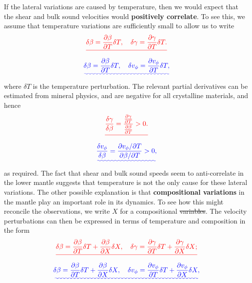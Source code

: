 \documentclass[a4paper,12pt]{paper}
\providecommand{\DIFadd}[1]{{\protect\color{blue}\uwave{#1}}} %
\providecommand{\DIFdel}[1]{{\protect\color{red}\sout{#1}}}                      %
\providecommand{\DIFaddbegin}{} %
\providecommand{\DIFaddend}{} %
\providecommand{\DIFdelbegin}{} %
\providecommand{\DIFdelend}{} %
\begin{document}
If the lateral variations are caused by temperature, then we would expect that the shear and bulk sound velocities 
would \textbf{positively correlate}. To see this, we assume that temperature variations are sufficiently small to allow us to write
\DIFdelbegin \begin{displaymath}
\DIFdel{\delta\beta=\frac{\partial\beta}{\partial T}\delta T, \quad \delta\gamma = \frac{\partial\gamma}{\partial T}\delta T.
}\end{displaymath}%
\DIFdelend \DIFaddbegin \begin{equation}\DIFadd{\label{eq:31}
\delta\beta=\frac{\partial\beta}{\partial T}\delta T, \quad \delta v_{\phi} = \frac{\partial v_{\phi}}{\partial T}\delta T,
}\end{equation}\DIFaddend 
where $\delta T$ is the temperature perturbation. The relevant partial derivatives can be estimated from mineral physics, and are 
negative for all crystalline materials, and hence
\DIFdelbegin \begin{displaymath}
\DIFdel{\frac{\delta\gamma}{\delta\beta}=\frac{\frac{\partial\gamma}{\partial T}}{\frac{\partial\beta}{\partial T}}>0.
}\end{displaymath}%
\DIFdelend \DIFaddbegin \begin{equation}\DIFadd{\label{eq:32}
\frac{\delta v_{\phi}}{\delta\beta}=\frac{\partial v_{\phi}/\partial T}{\partial\beta/\partial T}>0,
}\end{equation}\DIFaddend 
as required. The fact that shear and bulk sound speeds seem to anti-correlate in the lower mantle suggests that temperature is not 
the only cause for these lateral variations. The other possible explanation is that \textbf{compositional variations} in the mantle play an 
important role in its dynamics. To see how this might reconcile the observations, we write $X$ for a compositional \DIFdelbegin \DIFdel{variables}\DIFdelend \DIFaddbegin \DIFadd{variable}\DIFaddend . The 
velocity perturbations can then be expressed in terms of temperature and composition in the form
\DIFdelbegin \begin{displaymath}
\DIFdel{\delta\beta=\frac{\partial\beta}{\partial T}\delta T+\frac{\partial\beta}{\partial X}\delta X, \quad \delta\gamma=
\frac{\partial\gamma}{\partial T}\delta T+\frac{\partial\gamma}{\partial X}\delta X;
}\end{displaymath}%
\DIFdelend \DIFaddbegin \begin{equation}\DIFadd{\label{eq:33}
\delta\beta=\frac{\partial\beta}{\partial T}\delta T+\frac{\partial\beta}{\partial X}\delta X, \quad \delta v_{\phi}=
\frac{\partial v_{\phi}}{\partial T}\delta T+\frac{\partial v_{\phi}}{\partial X}\delta X,
}\end{equation}\DIFaddend 
\end{document}
